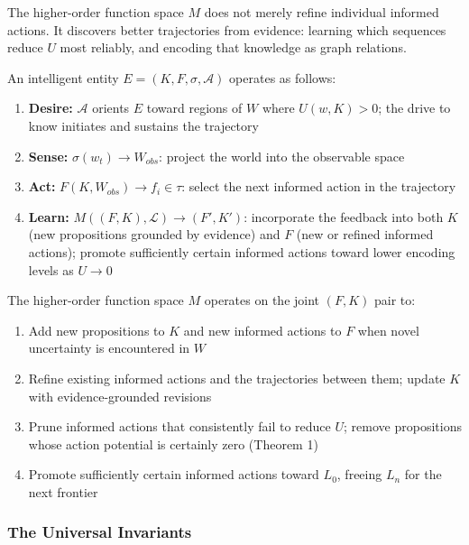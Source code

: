 \documentclass[
]{article}
\providecommand{\tightlist}{%
  \setlength{\itemsep}{0pt}\setlength{\parskip}{0pt}}
\begin{document}
The higher-order function space \(M\) does not merely refine individual
informed actions. It discovers better trajectories from evidence:
learning which sequences reduce \(U\) most reliably, and encoding that
knowledge as graph relations.

An intelligent entity \(E = (K, F, \sigma, \mathcal{A})\) operates as
follows:

\begin{enumerate}
\def\labelenumi{\arabic{enumi}.}
\tightlist
\item
  \textbf{Desire:} \(\mathcal{A}\) orients \(E\) toward regions of \(W\)
  where \(U(w, K) > 0\); the drive to know initiates and sustains the
  trajectory
\item
  \textbf{Sense:} \(\sigma(w_t) \rightarrow W_{obs}\): project the world
  into the observable space
\item
  \textbf{Act:} \(F(K, W_{obs}) \rightarrow f_i \in \tau\): select the
  next informed action in the trajectory
\item
  \textbf{Learn:} \(M((F, K), \mathcal{L}) \rightarrow (F', K')\):
  incorporate the feedback into both \(K\) (new propositions grounded by
  evidence) and \(F\) (new or refined informed actions); promote
  sufficiently certain informed actions toward lower encoding levels as
  \(U \rightarrow 0\)
\end{enumerate}

The higher-order function space \(M\) operates on the joint \((F, K)\)
pair to:

\begin{enumerate}
\def\labelenumi{\arabic{enumi}.}
\tightlist
\item
  Add new propositions to \(K\) and new informed actions to \(F\) when
  novel uncertainty is encountered in \(W\)
\item
  Refine existing informed actions and the trajectories between them;
  update \(K\) with evidence-grounded revisions
\item
  Prune informed actions that consistently fail to reduce \(U\); remove
  propositions whose action potential is certainly zero (Theorem 1)
\item
  Promote sufficiently certain informed actions toward \(L_0\), freeing
  \(L_n\) for the next frontier
\end{enumerate}

\subsubsection{The Universal Invariants}\label{the-universal-invariants}
\end{document}
